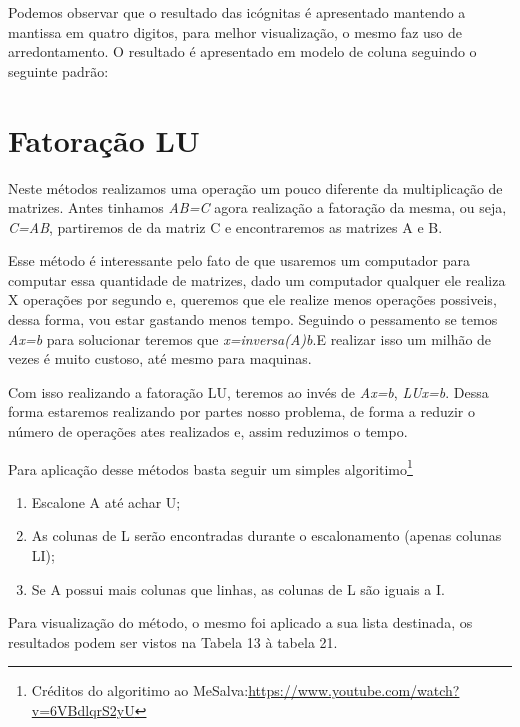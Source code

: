 \documentclass[12pt]{article}
\begin{document}
Podemos observar que o resultado das icógnitas é apresentado mantendo a mantissa em quatro digitos, para melhor visualização, o mesmo faz uso de arredontamento. O resultado é apresentado em modelo de coluna seguindo o seguinte padrão:

\left[ \begin{array}{c}
x \\
y \\
z 
\end{array} \right]

\section{Fatoração LU}

Neste métodos realizamos uma operação um pouco diferente da multiplicação de matrizes. Antes tinhamos \textit{AB=C} agora realização a fatoração da mesma, ou seja, \textit{C=AB}, partiremos de da matriz C e encontraremos as matrizes A e B.

Esse método é interessante pelo fato de que usaremos um computador para computar essa quantidade de matrizes, dado um computador qualquer ele realiza X operações por segundo e, queremos que ele realize menos operações possiveis, dessa forma, vou estar gastando menos tempo. Seguindo o pessamento se temos \textit{Ax=b} para solucionar teremos que \textit{x=inversa(A)b}.E realizar isso um milhão de vezes é muito custoso, até mesmo para maquinas.

Com isso realizando a fatoração LU, teremos ao invés de \textit{Ax=b}, \textit{LUx=b}. Dessa forma estaremos realizando por partes nosso problema, de forma a reduzir o número de operações ates realizados e, assim reduzimos o tempo.

Para aplicação desse métodos basta seguir um simples algoritimo\footnote{Créditos do algoritimo ao MeSalva:\url{https://www.youtube.com/watch?v=6VBdlqrS2yU}}
\begin{enumerate}[i]
   \item Escalone A até achar U;
   \item As colunas de L serão encontradas durante o escalonamento (apenas colunas LI);
   \item Se A possui mais colunas que linhas, as colunas de L são iguais a I.
 \end{enumerate}

Para visualização do método, o mesmo foi aplicado a sua lista destinada, os resultados podem ser vistos na Tabela 13 à tabela 21.
\end{document}
